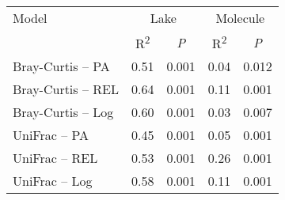 \begin{table}[ht]
\centering
\begin{tabular}{l r r r r }
  \hline
\hline
  Model & \multicolumn{2}{c}{Lake} & \multicolumn{2}{c}{Molecule} \\
  & \multicolumn{1}{c}{R\textsuperscript{2}} & 
                          \multicolumn{1}{c}{\emph{P}} & 
                          \multicolumn{1}{c}{R\textsuperscript{2}} & 
                          \multicolumn{1}{c}{\emph{P}} \\
 \hline
Bray-Curtis -- PA & 0.51 & 0.001 & 0.04 & 0.012 \\ 
  Bray-Curtis -- REL & 0.64 & 0.001 & 0.11 & 0.001 \\ 
  Bray-Curtis -- Log & 0.60 & 0.001 & 0.03 & 0.007 \\ 
  UniFrac -- PA & 0.45 & 0.001 & 0.05 & 0.001 \\ 
  UniFrac -- REL & 0.53 & 0.001 & 0.26 & 0.001 \\ 
  UniFrac -- Log & 0.58 & 0.001 & 0.11 & 0.001 \\ 
   \hline
\end{tabular}
\end{table}
